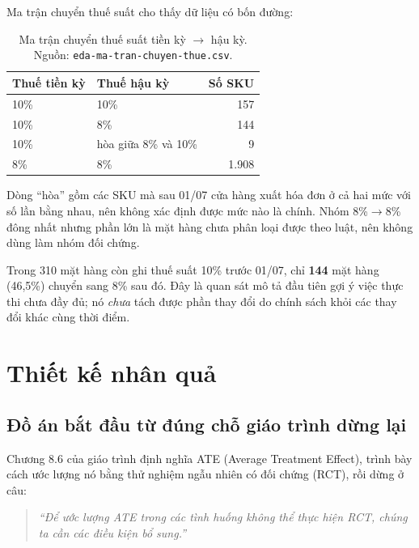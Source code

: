 \documentclass[11pt]{article}
\begin{document}
Ma trận chuyển thuế suất cho thấy dữ liệu có bốn đường:

\begin{table}[htbp]
  \centering
  \caption{Ma trận chuyển thuế suất tiền kỳ $\to$ hậu kỳ. Nguồn:
  \texttt{eda-ma-tran-chuyen-thue.csv}.}
  \label{tab:ma-tran-thue}
  \begin{tabular}{llr}
    \toprule
    Thuế tiền kỳ & Thuế hậu kỳ & Số SKU \\
    \midrule
    10\% & 10\%                 & 157 \\
    10\% & 8\%                  & 144 \\
    10\% & hòa giữa 8\% và 10\% & 9 \\
    8\%  & 8\%                  & 1.908 \\
    \bottomrule
  \end{tabular}
\end{table}

Dòng ``hòa'' gồm các SKU mà sau 01/07 cửa hàng xuất hóa đơn ở cả hai mức với số lần bằng nhau, nên
không xác định được mức nào là chính. Nhóm 8\%$\to$8\% đông nhất nhưng phần lớn là mặt hàng chưa
phân loại được theo luật, nên không dùng làm nhóm đối chứng.

Trong 310 mặt hàng còn ghi thuế suất 10\% trước 01/07, chỉ \textbf{144} mặt hàng (46,5\%) chuyển
sang 8\% sau đó. Đây là quan sát mô tả đầu tiên gợi ý việc thực thi chưa đầy đủ; nó \emph{chưa}
tách được phần thay đổi do chính sách khỏi các thay đổi khác cùng thời điểm.

\section{Thiết kế nhân quả}

\subsection{Đồ án bắt đầu từ đúng chỗ giáo trình dừng lại}

Chương 8.6 của giáo trình định nghĩa ATE (Average Treatment Effect), trình bày cách ước lượng nó
bằng thử nghiệm ngẫu nhiên có đối chứng (RCT), rồi dừng ở câu:

\begin{quote}
\itshape ``Để ước lượng ATE trong các tình huống không thể thực hiện RCT, chúng ta cần các điều
kiện bổ sung.''
\end{quote}
\end{document}
